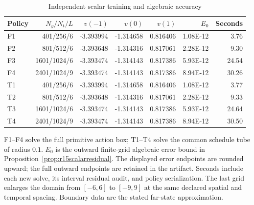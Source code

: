 \begin{table}[!htbp]
\centering\small
\caption{Independent scalar training and algebraic accuracy}
\label{tab:r15scalartraining}
\begin{tabular}{lrrrrrr}
\toprule
Policy & $N_y/N_t/L$ & $v(-1)$ & $v(0)$ & $v(1)$ & $E_0$ & Seconds \\
\midrule
F1 & 401/256/6 & -3.393994 & -1.314658 & 0.816406 & 1.08E-12 & 3.76 \\
F2 & 801/512/6 & -3.393648 & -1.314316 & 0.817061 & 2.28E-12 & 9.30 \\
F3 & 1601/1024/6 & -3.393474 & -1.314143 & 0.817386 & 5.93E-12 & 24.54 \\
F4 & 2401/1024/9 & -3.393474 & -1.314143 & 0.817386 & 8.94E-12 & 30.26 \\
T1 & 401/256/6 & -3.393994 & -1.314658 & 0.816406 & 1.08E-12 & 3.77 \\
T2 & 801/512/6 & -3.393648 & -1.314316 & 0.817061 & 2.28E-12 & 9.33 \\
T3 & 1601/1024/6 & -3.393474 & -1.314143 & 0.817386 & 5.93E-12 & 24.64 \\
T4 & 2401/1024/9 & -3.393474 & -1.314143 & 0.817386 & 8.94E-12 & 30.50 \\
\bottomrule
\end{tabular}
\par\medskip\noindent\footnotesize F1--F4 solve the full primitive action box; T1--T4 solve the common schedule tube of radius $0.1$. $E_0$ is the outward finite-grid algebraic error bound in Proposition~\ref{prop:r15scalarresidual}. The displayed error endpoints are rounded upward; the full outward endpoints are retained in the artifact. Seconds include each new solve, its interval residual audit, and policy serialization. The last grid enlarges the domain from $[-6,6]$ to $[-9,9]$ at the same declared spatial and temporal spacing. Boundary data are the stated far-state approximation.
\end{table}
